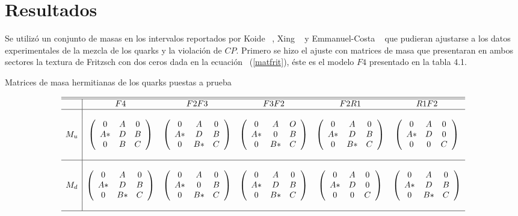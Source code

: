 \chapter{Resultados}

Se utiliz\'o un conjunto de masas en los intervalos reportados por Koide 
~\cite{Fus199701}, Xing ~\cite{xin200801} y Emmanuel-Costa ~\cite{Emm200901} 
que pudieran ajustarse a los datos experimentales de la mezcla de los quarks y
la violaci\'on de $CP$. Primero se hizo el ajuste con matrices de masa que 
presentaran en ambos sectores la textura de Fritzsch con dos ceros dada en la
ecuaci\'on ~(\ref{matfrit}), \'este es el modelo $F4$ presentado en la tabla 
4.1.
 
{\tiny
\begin{table}[h!]\label{ttt1}
\begin{scriptsize}
\caption{Matrices de {masa} hermitianas de los quarks puestas a prueba}
$$\ba{c|ccccc}\hline\hline
 & F4 & F2F3 & F3F2 & F2R1 & R1F2\\ \hline \\
M_u&\left(\ba{ccc} 0&A&0\\ A*&D&B\\ 0&B&C \ea\right) & 
\left(\ba{ccc} 0&A&0\\ A*&D&B\\ 0&B*&C \ea\right) & 
\left(\ba{ccc} 0&A&O\\ A*&0&B\\ 0&B*&C \ea\right) & 
\left(\ba{ccc} 0&A&0\\ A*&D&B\\ 0&B*&C \ea\right) & 
\left(\ba{ccc} 0&A&0\\ A*&D&0\\ 0&0&C \ea\right)\\  \\ \hline\\
M_d&\left(\ba{ccc} 0&A&0\\ A*&D&B\\ 0&B*&C \ea\right) & 
\left(\ba{ccc}     0&A&0\\ A*&0&B\\ 0&B*&C \ea\right) & 
\left(\ba{ccc}     0&A&0\\ A*&D&B\\ 0&B*&C \ea\right) & 
\left(\ba{ccc}     0&A&0\\ A*&D&0\\ 0&0&C \ea\right) & 
\left(\ba{ccc}     0&A&0\\ A*&D&B\\ 0&B*&C \ea\right)\\  \\ \hline
\ea $$
\end{scriptsize}
\end{table}
}


